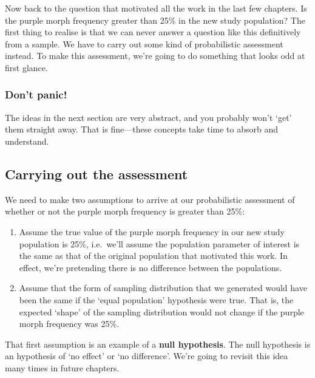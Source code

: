 \documentclass[
]{book}
\newenvironment{greybox}{
  \definecolor{shadecolor}{rgb}{0.95,0.95,0.95}  %
  \color{black}
  \begin{shaded}}
 {\end{shaded}}
\newenvironment{infobox}[1]
  {
  \begin{itemize}
  \renewcommand{\labelitemi}{
    \raisebox{-.7\height}[0pt][0pt]{
      {\setkeys{Gin}{width=3em,keepaspectratio}
        \texttt{[image: images/\#1]}}
    }
  }
  \setlength{\fboxsep}{1em}
  \begin{greybox}
  \item
  }
  {
  \end{greybox}
  \end{itemize}
  }
\begin{document}
Now back to the question that motivated all the work in the last few chapters. Is the purple morph frequency greater than 25\% in the new study population? The first thing to realise is that we can never answer a question like this definitively from a sample. We have to carry out some kind of probabilistic assessment instead. To make this assessment, we're going to do something that looks odd at first glance.

\begin{infobox}{warning}

\hypertarget{dont-panic}{%
\subsubsection*{Don't panic!}\label{dont-panic}}

The ideas in the next section are very abstract, and you probably won't `get' them straight away. That is fine---these concepts take time to absorb and understand.

\end{infobox}

\hypertarget{carrying-out-the-assessment}{%
\subsection*{Carrying out the assessment}\label{carrying-out-the-assessment}}

We need to make two assumptions to arrive at our probabilistic assessment of whether or not the purple morph frequency is greater than 25\%:

\begin{enumerate}
\def\labelenumi{\arabic{enumi}.}
\item
  Assume the true value of the purple morph frequency in our new study population is 25\%, i.e.~we'll assume the population parameter of interest is the same as that of the original population that motivated this work. In effect, we're pretending there is no difference between the populations.
\item
  Assume that the form of sampling distribution that we generated would have been the same if the `equal population' hypothesis were true. That is, the expected `shape' of the sampling distribution would not change if the purple morph frequency was 25\%.
\end{enumerate}

That first assumption is an example of a \textbf{null hypothesis}. The null hypothesis is an hypothesis of `no effect' or `no difference'. We're going to revisit this idea many times in future chapters.
\end{document}
